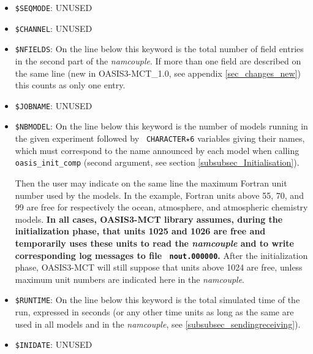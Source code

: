 \begin{itemize}

\item {\tt \$SEQMODE}: UNUSED

\item {\tt \$CHANNEL}: UNUSED

\item {\tt \$NFIELDS}: On the line below this keyword is the total
  number of field entries in the second part of the {\it
    namcouple}. If more than one field are described on the same line
  (new in OASIS3-MCT\_1.0, see appendix \ref{sec_changes_new}) this
  counts as only one entry.

\item {\tt \$JOBNAME}: UNUSED

\item {\tt \$NBMODEL}: On the line below this keyword is the number of
  models running in the given experiment followed by {\tt
    CHARACTER$\star$6} variables giving their names, which must
  correspond to the name announced by each model when calling {\tt
    oasis\_init\_comp} (second argument, see section
  \ref{subsubsec_Initialisation}).

  Then the user may indicate on the same line the maximum Fortran unit
  number used by the models. In the example, Fortran units above 55,
  70, and 99 are free for respectively the ocean, atmosphere, and
  atmospheric chemistry models. {\bf In all cases, OASIS3-MCT library
    assumes, during the initialization phase, that units 1025 and 1026
    are free and temporarily uses these units to read the {\it
      namcouple} and to write corresponding log messages to file {\tt
      nout.000000}.} After the initialization phase, OASIS3-MCT will
  still suppose that units above 1024 are free, unless maximum unit
  numbers are indicated here in the {\it namcouple}.

\item {\tt \$RUNTIME}: On the line below this keyword is the total
  simulated time of the run, expressed in seconds (or any other time
  units as long as the same are used in all models and in the {\it
    namcouple}, see \ref{subsubsec_sendingreceiving}).

\item {\tt \$INIDATE}: UNUSED


\end{itemize}
